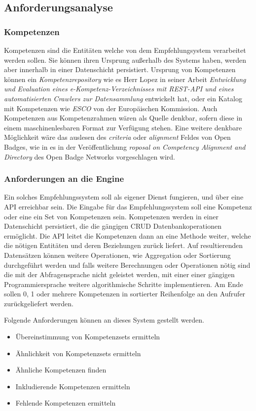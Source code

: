 \subsection{Anforderungsanalyse} 

\subsubsection{Kompetenzen}

Kompetenzen sind die Entitäten welche von dem Empfehlungsystem verarbeitet werden sollen. Sie können ihren Ursprung außerhalb des Systems haben, werden aber innerhalb in einer Datenschicht persistiert. Ursprung von Kompetenzen können ein \textit{Kompetenzrepository} wie es Herr Lopez in seiner Arbeit \textit{Entwicklung und Evaluation eines e-Kompetenz-Verzeichnisses mit REST-API und eines automatisierten Crawlers zur Datensammlung}\cite{lopez} entwickelt hat, oder ein Katalog mit Kompetenzen wie \textit{ESCO} von der Europäischen Kommission. Auch Kompetenzen aus Kompetenzrahmen wären als Quelle denkbar, sofern diese in einem maschinenlesbaren Format zur Verfügung stehen. Eine weitere denkbare Möglichkeit wäre das auslesen des \textit{criteria} oder \textit{alignment} Feldes von Open Badges, wie in es in der Veröffentlichung \textit{roposal on Competency Alignment and Directory} \cite{OBNO3-A2} des Open Badge Networks vorgeschlagen wird.

\subsubsection{Anforderungen an die Engine}
Ein solches Empfehlungssystem soll als eigener Dienst fungieren, und über eine API erreichbar sein. Die Eingabe für das Empfehlungssystem soll eine Kompetenz oder eine ein Set von Kompetenzen sein. Kompetenzen werden in einer Datenschicht persistiert, die die gängigen CRUD Datenbankoperationen ermöglicht. Die API leitet die Kompetenzen dann an eine Methode weiter, welche die nötigen Entitäten und deren Beziehungen zurück liefert. Auf resultierenden Datensätzen können weitere Operationen, wie Aggregation oder Sortierung durchgeführt werden und falls weitere Berechnungen oder Operationen nötig sind die mit der Abfragensprache nicht geleistet werden, mit einer einer gängigen Programmiersprache weitere algorithmische Schritte implementieren. Am Ende sollen 0, 1 oder mehrere Kompetenzen in sortierter Reihenfolge an den Aufrufer zurückgeliefert werden.

Folgende Anforderungen können an dieses System gestellt werden.
\begin{itemize}
	\item Übereinstimmung von Kompetenzsets ermitteln
	\item Ähnlichkeit von Kompetenzsets ermitteln
	\item Ähnliche Kompetenzen finden
	\item Inkludierende Kompetenzen ermitteln
	\item Fehlende Kompetenzen ermitteln
\end{itemize}

